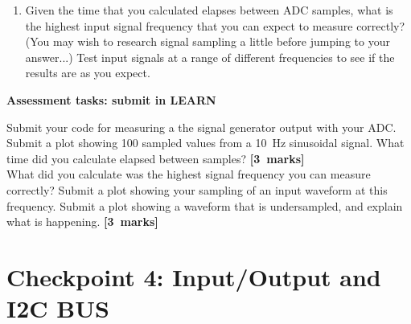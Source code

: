 \begin{enumerate}

\item [3.3.] Given the time that you calculated elapses between ADC samples, what is the highest input signal frequency that you can expect to measure correctly?
(You may wish to research signal sampling a little before jumping to your answer...)
Test input signals at a range of different frequencies to see if the results are as you expect.




 

\end{enumerate}

{\bf Assessment tasks: submit in LEARN}

Submit your code for measuring a the signal generator output with your ADC.
Submit a plot showing 100 sampled values from a 10~Hz sinusoidal signal.
What time did you calculate elapsed between samples?
\hfill {\bf[3~marks]} \\

What did you calculate was the highest signal frequency you can measure correctly?
Submit a plot showing your sampling of an input waveform at this frequency.
Submit a plot showing a waveform that is undersampled, and explain what is happening.
\hfill {\bf[3~marks]} \\


\newpage
\section{Checkpoint 4: Input/Output and I2C BUS}

